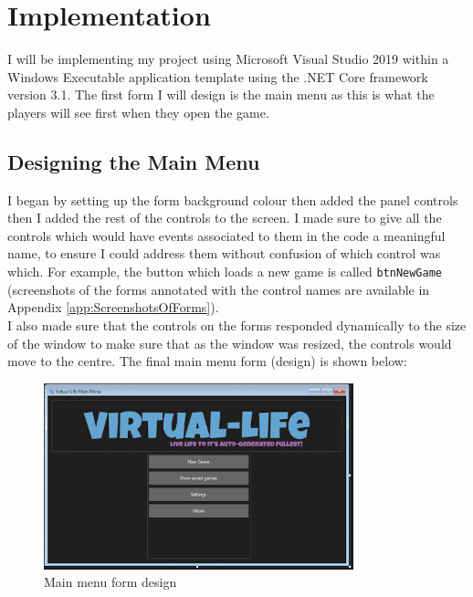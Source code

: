 \UseRawInputEncoding
\chapter{Implementation}
I will be implementing my project using Microsoft Visual Studio 2019 within a Windows Executable application template using the .NET Core framework version 3.1. \newline
The first form I will design is the main menu as this is what the players will see first when they open the game.

\section{Designing the Main Menu}
I began by setting up the form background colour then added the panel controls then I added the rest of the controls to the screen. I made sure to give all the controls which would have events associated to them in the code a meaningful name, to ensure I could address them without confusion of which control was which. For example, the button which loads a new game is called \verb|btnNewGame| (screenshots of the forms annotated with the control names are available in Appendix \ref{app:ScreenshotsOfForms}).\\
I also made sure that the controls on the forms responded dynamically to the size of the window to make sure that as the window was resized, the controls would move to the centre.
The final main menu form (design) is shown below:
\begin{figure}[H]
    \centering
    \includegraphics[width=0.8\textwidth]{images/implementation/mainMenu.png}
    \caption{Main menu form design}
    \label{fig:implementation-mainMenu}
\end{figure}

